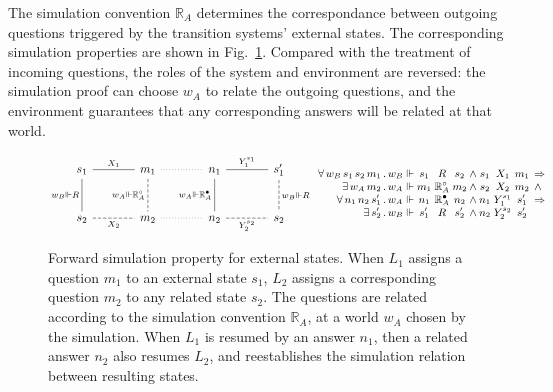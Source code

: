 \documentclass[draft,11pt]{report}
\newcommand{\que}{\circ}         %
\newcommand{\ans}{\bullet}       %
\begin{document}
The simulation convention $\mathbb{R}_A$
determines the correspondance between
outgoing questions triggered by
the transition systems' external states.
The corresponding simulation properties
are shown in Fig.~\ref{fig:fsim-ext}.
Compared with the treatment of incoming questions,
the roles of the system and environment are reversed:
the simulation proof can choose $w_A$
to relate the outgoing questions,
and the environment guarantees that any corresponding answers
will be related at that world.

\begin{figure} %
  \[
      \begin{tikzcd}[sep=large,baseline=-3pt]
        s_1 \ar[r, "X_1", dash] \ar[d, "w_B \Vdash R"', dash] &
        m_1 \ar[r, dotted, dash] \ar[d, "w_A \Vdash \mathbb{R}_A^\que"', dash, dashed] &
        n_1 \ar[r, "Y_1^{s_1}", dash] \ar[d, "w_A \Vdash \mathbb{R}_A^\ans"', dash] &
        s_1' \ar[d, "w_B \Vdash R", dash, dashed]
        \\
        s_2 \ar[r, "X_2"', dash, dashed] &
        m_2 \ar[r, dotted, dash] &
        n_2 \ar[r, "Y_2^{s_2}"', dash, dashed] &
        s_2
      \end{tikzcd}
      \small
      \begin{array}{
          r @{\,.\,} l @{{} \Vdash {}} c@{}c@{}c @{\:\wedge\:}
                                    c@{}c@{}c @{\:\:} l}
        \forall \, w_B \, s_1 \, s_2 \, m_1 & w_B & s_1 & {}\mathrel{R}{} & s_2 &
                        s_1 & {}\mathrel{X_1}{} & m_1 & \Rightarrow \\
        \exists \, w_A \, m_2 & w_A & m_1 & {}\mathrel{\mathbb{R}_A^\que}{} & m_2 &
                        s_2 & {}\mathrel{X_2}{} & m_2 & \wedge \\
        \forall \, n_1 \, n_2 \, s_1' & w_A & n_1 & {}\mathrel{\mathbb{R}_A^\ans}{} & n_2 &
                        n_1 & {}\mathrel{Y_1^{s_1}}{} & s_1' & \Rightarrow \\
        \exists \, s_2' & w_B & s_1' & {}\mathrel{R}{} & s_2' &
                        n_2 & {}\mathrel{Y_2^{s_2}}{} & s_2' &
      \end{array}
  \]
  \caption{Forward simulation property for external states.
    When $L_1$ assigns a question $m_1$ to an external state $s_1$,
    $L_2$ assigns a corresponding question $m_2$ to any related state $s_2$.
    The questions are related according to
    the simulation convention $\mathbb{R}_A$,
    at a world $w_A$ chosen by the simulation.
    When $L_1$ is resumed by an answer $n_1$,
    then a related answer $n_2$ also resumes $L_2$,
    and reestablishes the simulation relation
    between resulting states.}
  \label{fig:fsim-ext}
\end{figure}
\end{document}
